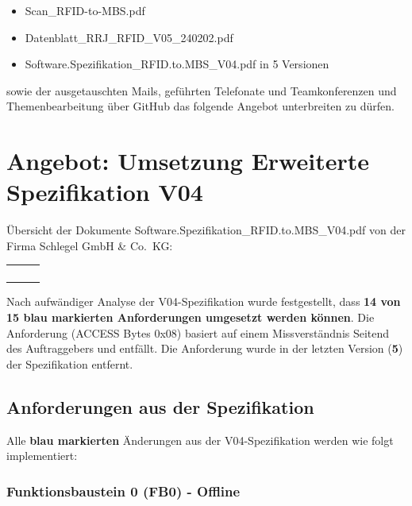 \documentclass[a4paper,11pt]{article}
\begin{document}
\begin{itemize}
\item
  Scan\_RFID-to-MBS.pdf
\item
  Datenblatt\_RRJ\_RFID\_V05\_240202.pdf
\item
  Software.Spezifikation\_RFID.to.MBS\_V04.pdf in 5 Versionen
\end{itemize}

sowie der ausgetauschten Mails, geführten Telefonate und Teamkonferenzen
und Themenbearbeitung über GitHub das folgende Angebot unterbreiten zu
dürfen.

\hypertarget{angebot-umsetzung-erweiterte-spezifikation-v04}{%
\section{Angebot: Umsetzung Erweiterte Spezifikation
V04}\label{angebot-umsetzung-erweiterte-spezifikation-v04}}

Übersicht der Dokumente Software.Spezifikation\_RFID.to.MBS\_V04.pdf von
der Firma Schlegel GmbH \& Co.~KG:

\begin{tabular}{|l|l|l|}
\hline
 \\ \hline
 \\ \hline
 \\ \hline
 \\ \hline
 \\ \hline
\end{tabular}

Nach aufwändiger Analyse der V04-Spezifikation wurde festgestellt, dass
\textbf{14 von 15 blau markierten Anforderungen umgesetzt werden
können}. Die Anforderung (ACCESS Bytes 0x08) basiert auf einem
Missverständnis Seitend des Auftraggebers und entfällt. Die Anforderung
wurde in der letzten Version (\textbf{5}) der Spezifikation entfernt.

\hypertarget{anforderungen-aus-der-spezifikation}{%
\subsection{Anforderungen aus der
Spezifikation}\label{anforderungen-aus-der-spezifikation}}

Alle \textbf{blau markierten} Änderungen aus der V04-Spezifikation
werden wie folgt implementiert:

\hypertarget{funktionsbaustein-0-fb0---offline}{%
\subsubsection{Funktionsbaustein 0 (FB0) -
Offline}\label{funktionsbaustein-0-fb0---offline}}
\end{document}
